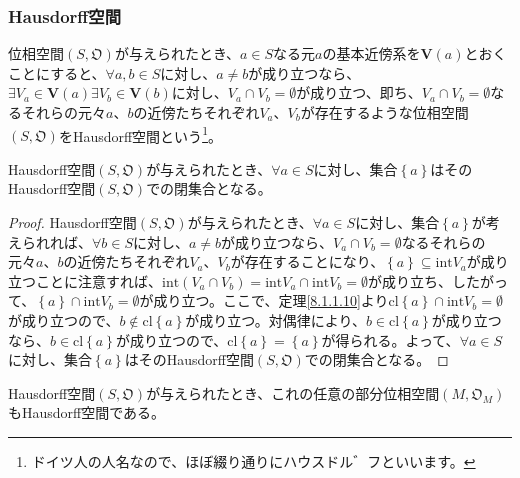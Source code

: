 \documentclass[dvipdfmx]{jsarticle}
\begin{document}
\subsubsection{Hausdorff空間}%
\begin{dfn}
位相空間$\left( S,\mathfrak{O} \right)$が与えられたとき、$a \in S$なる元$a$の基本近傍系を$\mathbf{V}(a)$とおくことにすると、$\forall a,b \in S$に対し、$a \neq b$が成り立つなら、$\exists V_{a} \in \mathbf{V}(a)\exists V_{b} \in \mathbf{V}(b)$に対し、$V_{a} \cap V_{b} = \emptyset$が成り立つ、即ち、$V_{a} \cap V_{b} = \emptyset$なるそれらの元々$a$、$b$の近傍たちそれぞれ$V_{a}$、$V_{b}$が存在するような位相空間$\left( S,\mathfrak{O} \right)$をHausdorff空間という\footnote{ドイツ人の人名なので、ほぼ綴り通りにハウスドル゛フといいます。}。
\end{dfn}
\begin{thm}\label{8.1.6.8}
Hausdorff空間$\left( S,\mathfrak{O} \right)$が与えられたとき、$\forall a \in S$に対し、集合$\left\{ a \right\}$はそのHausdorff空間$\left( S,\mathfrak{O} \right)$での閉集合となる。
\end{thm}
\begin{proof}
Hausdorff空間$\left( S,\mathfrak{O} \right)$が与えられたとき、$\forall a \in S$に対し、集合$\left\{ a \right\}$が考えられれば、$\forall b \in S$に対し、$a \neq b$が成り立つなら、$V_{a} \cap V_{b} = \emptyset$なるそれらの元々$a$、$b$の近傍たちそれぞれ$V_{a}$、$V_{b}$が存在することになり、$\left\{ a \right\} \subseteq {\mathrm{int}}V_{a}$が成り立つことに注意すれば、${\mathrm{int}}\left( V_{a} \cap V_{b} \right) = {\mathrm{int}}V_{a} \cap {\mathrm{int}}V_{b} = \emptyset$が成り立ち、したがって、$\left\{ a \right\} \cap {\mathrm{int}}V_{b} = \emptyset$が成り立つ。ここで、定理\ref{8.1.1.10}より${\mathrm{cl}}\left\{ a \right\} \cap {\mathrm{int}}V_{b} = \emptyset$が成り立つので、$b \notin {\mathrm{cl}}\left\{ a \right\}$が成り立つ。対偶律により、$b \in {\mathrm{cl}}\left\{ a \right\}$が成り立つなら、$b \in {\mathrm{cl}}\left\{ a \right\}$が成り立つので、${\mathrm{cl}}\left\{ a \right\} = \left\{ a \right\}$が得られる。よって、$\forall a \in S$に対し、集合$\left\{ a \right\}$はそのHausdorff空間$\left( S,\mathfrak{O} \right)$での閉集合となる。
\end{proof}
\begin{thm}\label{8.1.6.9}
Hausdorff空間$\left( S,\mathfrak{O} \right)$が与えられたとき、これの任意の部分位相空間$\left( M,\mathfrak{O}_{M} \right)$もHausdorff空間である。
\end{thm}
\end{document}
